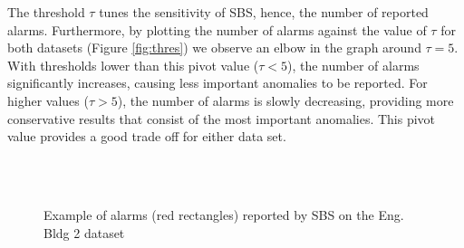 The threshold $\tau$ tunes the sensitivity of SBS, hence, the number of reported alarms.  
Furthermore, by plotting the number of alarms against the value of $\tau$ for both datasets (Figure \ref{fig:thres}) we observe an 
elbow in the graph around $\tau=5$.
With thresholds lower than this pivot value ($\tau<5$), the number of alarms significantly increases, causing less important anomalies 
to be reported.  
For higher values ($\tau>5$), the number of alarms is slowly decreasing, providing more conservative results that consist of the 
most important anomalies.
This pivot value provides a good trade off for either data set.

\begin{figure}
   \hspace{.015\textwidth} %
   \hspace{.015\textwidth}  %
 \\ %
 \\  
\caption{Example of alarms (red rectangles) reported by SBS on the Eng. Bldg 2 dataset}
\end{figure}


